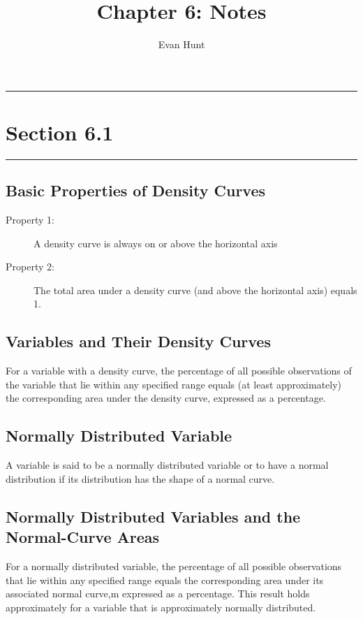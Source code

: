 \documentclass[12pt]{article}
\title{Chapter 6: Notes}
\author{Evan Hunt}
\begin{document}
    \maketitle

    \noindent\rule{\textwidth}{0.4pt}
    \section*{Section 6.1}
    \noindent\rule{\textwidth}{0.4pt}
        \subsection*{Basic Properties of Density Curves}
            \begin{description}
                \item[Property 1:] A density curve is always on or above the horizontal axis
                \item[Property 2:] The total area under a density curve (and above the horizontal
                axis) equals 1.                
            \end{description}
        \subsection*{Variables and Their Density Curves}
            For a variable with a density curve, the percentage of all possible observations of
            the variable that lie within any specified range equals (at least approximately) the
            corresponding area under the density curve, expressed as a percentage.
        \subsection*{Normally Distributed Variable}
            A variable is said to be a normally distributed variable or to have a normal
            distribution if its distribution has the shape of a normal curve.
        \subsection*{Normally Distributed Variables and the Normal-Curve Areas}
            For a normally distributed variable, the percentage of all possible observations that
            lie within any specified range equals the corresponding area under its associated
            normal curve,m expressed as a percentage. This result holds approximately for a
            variable that is approximately normally distributed.
\end{document}
